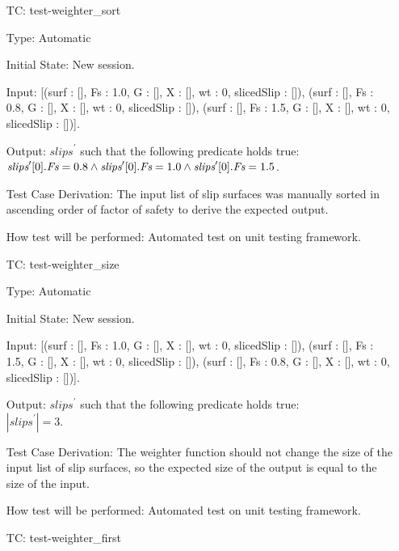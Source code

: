 \documentclass[12pt, titlepage]{article}
\newcounter{utestnum} %
\begin{document}
\begin{enumerate}[label=TC\arabic*:,ref={\arabic*}]
	
	\item [TC\refstepcounter{utestnum}\theutestnum: \label{TC_WeighterSort}] 
	test-weighter\_sort
	
	Type: Automatic
	
	Initial State: New session.
	
	Input: [(surf : [], Fs : 1.0, G : [], X : [], wt : 0, slicedSlip : []), 
	(surf : [], Fs : 0.8, G : [], X : [], wt : 0, slicedSlip : []), 
	(surf : [], Fs : 1.5, G : [], X : [], wt : 0, slicedSlip : [])].
	
	Output: $\textit{slips}^\prime$ such that the following predicate holds 
	true:\\ 
	$\textit{slips}^\prime[0].\textit{Fs} = 0.8\\ 
	\land \textit{slips}^\prime[0].\textit{Fs} = 1.0 \\
	\land \textit{slips}^\prime[0].\textit{Fs} = 1.5$.
	
	Test Case Derivation: The input list of slip surfaces was manually sorted 
	in ascending order of factor of safety to derive the expected output.
	
	How test will be performed: Automated test on unit testing framework.
	
	\item [TC\refstepcounter{utestnum}\theutestnum: \label{TC_WeighterSize}] 
	test-weighter\_size
	
	Type: Automatic
	
	Initial State: New session.
	
	Input: [(surf : [], Fs : 1.0, G : [], X : [], wt : 0, slicedSlip : []), 
	(surf : [], Fs : 1.5, G : [], X : [], wt : 0, slicedSlip : []),
	(surf : [], Fs : 0.8, G : [], X : [], wt : 0, slicedSlip : [])].
	
	Output: $\textit{slips}^\prime$ such that the following predicate holds 
	true:\\ 
	$|\textit{slips}^\prime| = 3$.
	
	Test Case Derivation: The weighter function should not change the size of 
	the input list of slip surfaces, so the expected size of the output is 
	equal to the size of the input.
	
	How test will be performed: Automated test on unit testing framework.
	
	\item [TC\refstepcounter{utestnum}\theutestnum: \label{TC_WeighterFirst}] 
	test-weighter\_first
	

\end{enumerate}
\end{document}
